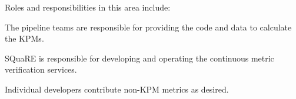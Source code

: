 Roles and responsibilities in this area include:

\begin{itemize_single}

\item The pipeline teams are responsible for providing the code and data to calculate the KPMs.

\item SQuaRE is responsible for developing and operating the continuous metric verification services.

\item Individual developers contribute non-KPM metrics as desired.

\end{itemize_single}
